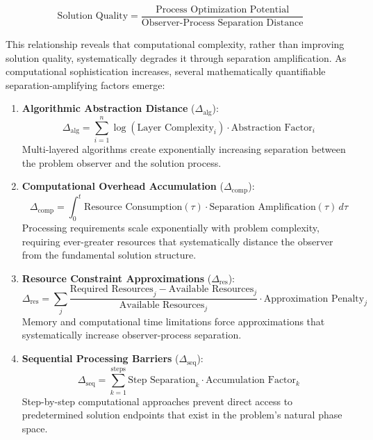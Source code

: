 \documentclass[11pt]{article}
\theoremstyle{definition}
\theoremstyle{remark}
\begin{document}
\begin{equation}
\text{Solution Quality} = \frac{\text{Process Optimization Potential}}{\text{Observer-Process Separation Distance}}
\label{eq:fundamental_quality_relationship}
\end{equation}

This relationship reveals that computational complexity, rather than improving solution quality, systematically degrades it through separation amplification. As computational sophistication increases, several mathematically quantifiable separation-amplifying factors emerge:

\begin{enumerate}
\item \textbf{Algorithmic Abstraction Distance} ($\Delta_{\text{alg}}$): 
\begin{equation}
\Delta_{\text{alg}} = \sum_{i=1}^{n} \log(\text{Layer Complexity}_i) \cdot \text{Abstraction Factor}_i
\end{equation}
Multi-layered algorithms create exponentially increasing separation between the problem observer and the solution process.

\item \textbf{Computational Overhead Accumulation} ($\Delta_{\text{comp}}$):
\begin{equation}
\Delta_{\text{comp}} = \int_0^t \text{Resource Consumption}(\tau) \cdot \text{Separation Amplification}(\tau) \, d\tau
\end{equation}
Processing requirements scale exponentially with problem complexity, requiring ever-greater resources that systematically distance the observer from the fundamental solution structure.

\item \textbf{Resource Constraint Approximations} ($\Delta_{\text{res}}$):
\begin{equation}
\Delta_{\text{res}} = \sum_{j} \frac{\text{Required Resources}_j - \text{Available Resources}_j}{\text{Available Resources}_j} \cdot \text{Approximation Penalty}_j
\end{equation}
Memory and computational time limitations force approximations that systematically increase observer-process separation.

\item \textbf{Sequential Processing Barriers} ($\Delta_{\text{seq}}$):
\begin{equation}
\Delta_{\text{seq}} = \sum_{k=1}^{\text{steps}} \text{Step Separation}_k \cdot \text{Accumulation Factor}_k
\end{equation}
Step-by-step computational approaches prevent direct access to predetermined solution endpoints that exist in the problem's natural phase space.


\end{enumerate}
\end{document}
